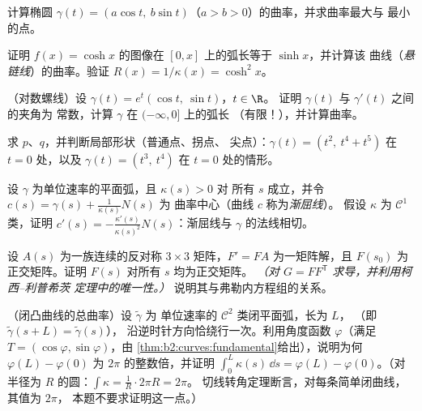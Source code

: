 \begin{exercise}[$\star$]\label{exo:b2:curves:2}
计算椭圆 $\gamma(t) = (a\cos t,\ b\sin
t)$（$a > b > 0$）的曲率，并求曲率最大与
最小的点。
\end{exercise}

\begin{exercise}[$\star$]\label{exo:b2:curves:3}
证明 $f(x) = \cosh x$ 的图像在
$[0, x]$ 上的弧长等于 $\sinh x$，并计算该
曲线（\emph{悬链线}）的曲率。验证 $R(x) = 1/\kappa(x) =
\cosh^2 x$。
\end{exercise}

\begin{exercise}[$\star\star$]\label{exo:b2:curves:4}
（对数螺线）设 $\gamma(t) = e^{t}(\cos t,\ \sin t)$，$t
\in \R$。
证明 $\gamma(t)$ 与 $\gamma'(t)$ 之间的夹角为
常数，计算 $\gamma$ 在 $(-\infty, 0]$ 上的弧长
（有限！），并计算曲率。
\end{exercise}

\begin{exercise}[$\star\star$]\label{exo:b2:curves:5}
求 $p$、$q$，并判断局部形状（普通点、拐点、
尖点）：$\gamma(t) = (t^2,\ t^4 + t^5)$ 在 $t = 0$ 处，以及
$\gamma(t) = (t^3,\ t^4)$ 在 $t = 0$ 处的情形。
\end{exercise}

\begin{exercise}[$\star\star$]\label{exo:b2:curves:6}
设 $\gamma$ 为单位速率的平面弧，且 $\kappa(s) > 0$ 对
所有 $s$ 成立，并令 $c(s) = \gamma(s) + \frac{1}{\kappa(s)}N(s)$ 为
曲率中心（曲线 $c$ 称为\emph{渐屈线}）。
假设 $\kappa$ 为 $\mathcal{C}^1$ 类，证明 $c'(s) =
-\frac{\kappa'(s)}{\kappa(s)^2}N(s)$：渐屈线与
$\gamma$ 的法线相切。
\end{exercise}

\begin{exercise}[$\star\star\star$]\label{exo:b2:curves:7}
设 $A(s)$ 为一族连续的反对称 $3 \times 3$
矩阵，$F' = F A$ 为一矩阵解，且 $F(s_0)$
为正交矩阵。证明 $F(s)$ 对所有 $s$ 均为正交矩阵。
\emph{（对 $G = F F^{\mathsf T}$ 求导，并利用柯西–利普希茨
定理中的唯一性。）} 说明其与弗勒内方程组的关系。
\end{exercise}

\begin{exercise}[$\star\star\star$]\label{exo:b2:curves:8}
（闭凸曲线的总曲率）设 $\tilde\gamma$ 为
单位速率的 $\mathcal{C}^2$ 类闭平面弧，长为 $L$，
（即 $\tilde\gamma(s + L) = \tilde\gamma(s)$），
沿逆时针方向恰绕行一次。利用角度函数 $\varphi$（满足 $T =
(\cos\varphi, \sin\varphi)$，由
\cref{thm:b2:curves:fundamental}给出），说明为何 $\varphi(L) -
\varphi(0)$ 为 $2\pi$ 的整数倍，并证明
$\int_0^L \kappa(s)\,\dd s = \varphi(L) - \varphi(0)$。（对半径为
$R$ 的圆：$\int \kappa = \frac1R \cdot 2\pi R = 2\pi$。
切线转角定理断言，对每条简单闭曲线，其值为 $2\pi$，
本题不要求证明这一点。）
\end{exercise}

